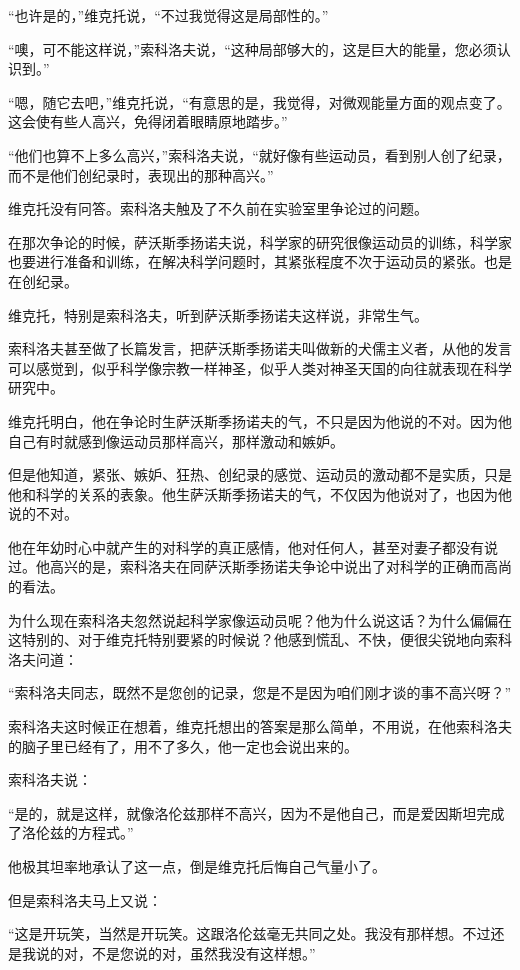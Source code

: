 “也许是的，”维克托说，“不过我觉得这是局部性的。”

“噢，可不能这样说，”索科洛夫说，“这种局部够大的，这是巨大的能量，您必须认识到。”

“嗯，随它去吧，”维克托说，“有意思的是，我觉得，对微观能量方面的观点变了。这会使有些人高兴，免得闭着眼睛原地踏步。”

“他们也算不上多么高兴，”索科洛夫说，“就好像有些运动员，看到别人创了纪录，而不是他们创纪录时，表现出的那种高兴。”

维克托没有冋答。索科洛夫触及了不久前在实验室里争论过的问题。

在那次争论的时候，萨沃斯季扬诺夫说，科学家的研究很像运动员的训练，科学家也要进行准备和训练，在解决科学问题时，其紧张程度不次于运动员的紧张。也是在创纪录。

维克托，特别是索科洛夫，听到萨沃斯季扬诺夫这样说，非常生气。

索科洛夫甚至做了长篇发言，把萨沃斯季扬诺夫叫做新的犬儒主义者，从他的发言可以感觉到，似乎科学像宗教一样神圣，似乎人类对神圣天国的向往就表现在科学研究中。

维克托明白，他在争论时生萨沃斯季扬诺夫的气，不只是因为他说的不对。因为他自己有时就感到像运动员那样高兴，那样激动和嫉妒。

但是他知道，紧张、嫉妒、狂热、创纪录的感觉、运动员的激动都不是实质，只是他和科学的关系的表象。他生萨沃斯季扬诺夫的气，不仅因为他说对了，也因为他说的不对。

他在年幼时心中就产生的对科学的真正感情，他对任何人，甚至对妻子都没有说过。他高兴的是，索科洛夫在同萨沃斯季扬诺夫争论中说出了对科学的正确而高尚的看法。

为什么现在索科洛夫忽然说起科学家像运动员呢？他为什么说这话？为什么偏偏在这特别的、对于维克托特别要紧的时候说？他感到慌乱、不快，便很尖锐地向索科洛夫问道：

“索科洛夫同志，既然不是您创的记录，您是不是因为咱们刚才谈的事不高兴呀？”

索科洛夫这时候正在想着，维克托想出的答案是那么简单，不用说，在他索科洛夫的脑子里已经有了，用不了多久，他一定也会说出来的。

索科洛夫说：

“是的，就是这样，就像洛伦兹那样不高兴，因为不是他自己，而是爱因斯坦完成了洛伦兹的方程式。”

他极其坦率地承认了这一点，倒是维克托后悔自己气量小了。

但是索科洛夫马上又说：

“这是开玩笑，当然是开玩笑。这跟洛伦兹毫无共同之处。我没有那样想。不过还是我说的对，不是您说的对，虽然我没有这样想。”

